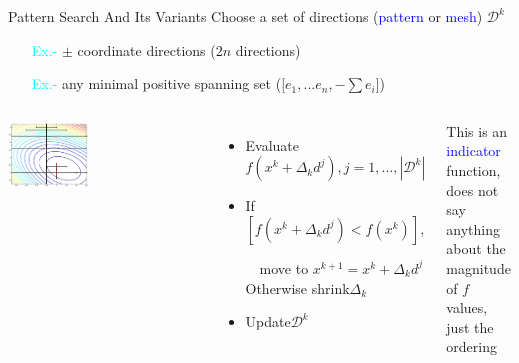 \documentclass[handout,aspectratio=54]{beamer}
\numberwithin{theorem}{section}
\begin{document}
\begin{frame}{Pattern Search And Its Variants}\footnotesize
Choose a set of directions (\textcolor{blue}{pattern} or \textcolor{blue}{mesh}) $\mathcal{D}^k$

\begin{itemize}
\item[\textcolor{cyan}{Ex.-}] $\pm$ coordinate directions ($2n$ directions)
\item[\textcolor{cyan}{Ex.-}] any minimal positive spanning set ([$e_1,...e_n,-\sum e_i$])
\end{itemize}

\begin{columns}
\includegraphics[width=\textwidth]{fig/17-7.jpg}

\colorbox[rgb]{0.5,0.6,0.7}{\textcolor{white}{Basic iteration($k\ge0$):}}
\begin{itemize}\scriptsize
\item Evaluate $f(x^k+\Delta_kd^j),j=1,...,|\mathcal{D}^k|$
\item If $[f(x^k+\Delta_kd^j)<f(x^k)]$, 

$\quad$move to $x^{k+1}=x^k+\Delta_kd^j$\\

Otherwise shrink$\Delta_k$
\item Update$\mathcal{D}^k$
\end{itemize}
This is an \textcolor{blue}{indicator} function, does not say anything about the magnitude of $f$ values, just the ordering
\end{columns}


\end{frame}
\end{document}
